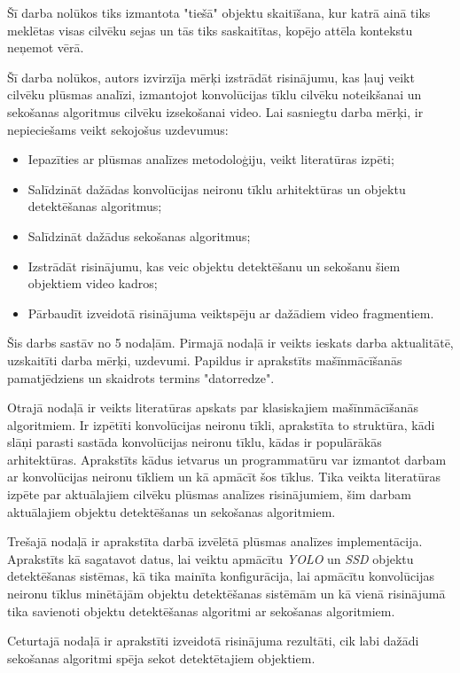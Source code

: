 Šī darba nolūkos tiks izmantota "tiešā" objektu skaitīšana, kur katrā ainā tiks meklētas visas cilvēku sejas un tās tiks saskaitītas, kopējo attēla kontekstu neņemot vērā.

Šī darba nolūkos, autors izvirzīja mērķi izstrādāt risinājumu, kas ļauj veikt cilvēku plūsmas analīzi, izmantojot konvolūcijas tīklu cilvēku noteikšanai un sekošanas algoritmus cilvēku izsekošanai video. Lai sasniegtu darba mērķi, ir nepieciešams veikt sekojošus uzdevumus:
\begin{itemize}
	\item Iepazīties ar plūsmas analīzes metodoloģiju, veikt literatūras izpēti;	
	\item Salīdzināt dažādas konvolūcijas neironu tīklu arhitektūras un objektu detektēšanas algoritmus;
	\item Salīdzināt dažādus sekošanas algoritmus;
	\item Izstrādāt risinājumu, kas veic objektu detektēšanu un sekošanu šiem objektiem video kadros;
	\item Pārbaudīt izveidotā risinājuma veiktspēju ar dažādiem video fragmentiem.	
\end{itemize}

Šis darbs sastāv no 5 nodaļām. Pirmajā nodaļā ir veikts ieskats darba aktualitātē, uzskaitīti darba mērķi, uzdevumi. Papildus ir aprakstīts  mašīnmācīšanās pamatjēdziens un skaidrots termins "datorredze".

Otrajā nodaļā ir veikts literatūras apskats par klasiskajiem mašīnmācīšanās algoritmiem. Ir izpētīti konvolūcijas neironu tīkli, aprakstīta to struktūra, kādi slāņi parasti sastāda konvolūcijas neironu tīklu, kādas ir populārākās arhitektūras. Aprakstīts kādus ietvarus un programmatūru
var izmantot darbam ar konvolūcijas neironu tīkliem un kā apmācīt šos tīklus. Tika veikta literatūras izpēte par aktuālajiem cilvēku plūsmas analīzes risinājumiem, šim darbam aktuālajiem objektu detektēšanas un sekošanas algoritmiem.

Trešajā nodaļā ir aprakstīta darbā izvēlētā plūsmas analīzes implementācija. Aprakstīts kā sagatavot datus, lai veiktu apmācītu \textit{YOLO} un \textit{SSD} objektu detektēšanas sistēmas, kā tika mainīta konfigurācija, lai apmācītu konvolūcijas neironu tīklus minētājām objektu detektēšanas sistēmām un kā vienā risinājumā tika savienoti objektu detektēšanas algoritmi ar sekošanas algoritmiem.

Ceturtajā nodaļā ir aprakstīti izveidotā risinājuma rezultāti, cik labi dažādi sekošanas algoritmi spēja sekot detektētajiem objektiem.

